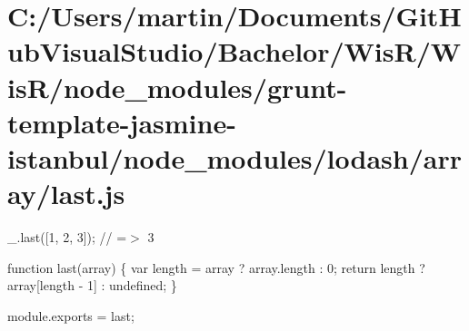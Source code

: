 \hypertarget{_c_1_2_users_2martin_2_documents_2_git_hub_visual_studio_2_bachelor_2_wis_r_2_wis_r_2node_moduledafc5058d1c073a9a84f88e492fe5be8}{}\section{C\+:/\+Users/martin/\+Documents/\+Git\+Hub\+Visual\+Studio/\+Bachelor/\+Wis\+R/\+Wis\+R/node\+\_\+modules/grunt-\/template-\/jasmine-\/istanbul/node\+\_\+modules/lodash/array/last.\+js}
\+\_\+.\+last(\mbox{[}1, 2, 3\mbox{]}); // =$>$ 3


\begin{DoxyCodeInclude}

\textcolor{keyword}{function} last(array) \{
  var length = array ? array.length : 0;
  \textcolor{keywordflow}{return} length ? array[length - 1] : undefined;
\}

module.exports = last;
\end{DoxyCodeInclude}
 